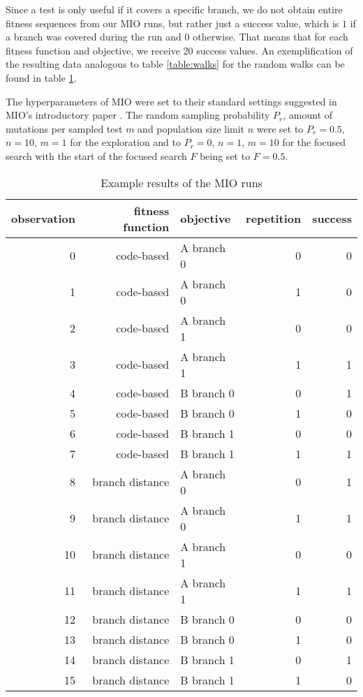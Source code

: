 Since a test is only useful if it covers a specific branch, we do not obtain entire fitness sequences from our MIO runs, but rather just a success value, which is $1$ if a branch was covered during the run and $0$ otherwise.
That means that for each fitness function and objective, we receive 20 success values. An exemplification of the resulting data analogous to table \ref{table:walks} for the random walks can be found in table \ref{table:runs}.

The hyperparameters of MIO were set to their standard settings suggested in MIO's introductory paper \cite{arcuri2018test}. The random sampling probability $P_r$, amount of mutations per sampled test $m$ and population size limit $n$ were set to $P_r = 0.5$, $n = 10$, $m = 1$ for the exploration and to $P_r = 0$, $n = 1$, $m = 10$ for the focused search with the start of the focused search $F$ being set to $F = 0.5$.

\begin{table}
	\caption{Example results of the MIO runs}\label{table:runs}
	\begin{center}
		\begin{tabular}{rrlrr}\toprule
			observation & fitness function & objective & repetition & success\\
			\midrule
			
			0 & code-based & A branch 0 & 0 & 0\\
			1 & code-based & A branch 0 & 1 & 0\\
			2 & code-based & A branch 1 & 0 & 0\\
			3 & code-based & A branch 1 & 1 & 1\\
			
			4 & code-based & B branch 0 & 0 & 1\\
			5 & code-based & B branch 0 & 1 & 0\\
			6 & code-based & B branch 1 & 0 & 0\\
			7 & code-based & B branch 1 & 1 & 1\\
			
			8 & branch distance & A branch 0 & 0 & 1\\
			9 & branch distance & A branch 0 & 1 & 1\\
			10 & branch distance & A branch 1 & 0 & 0\\
			11 & branch distance & A branch 1 & 1 & 1\\
			
			12 & branch distance & B branch 0 & 0 & 0\\
			13 & branch distance & B branch 0 & 1 & 0\\
			14 & branch distance & B branch 1 & 0 & 1\\
			15 & branch distance & B branch 1 & 1 & 0\\
			
			\bottomrule
		\end{tabular}
	\end{center}
\end{table}
